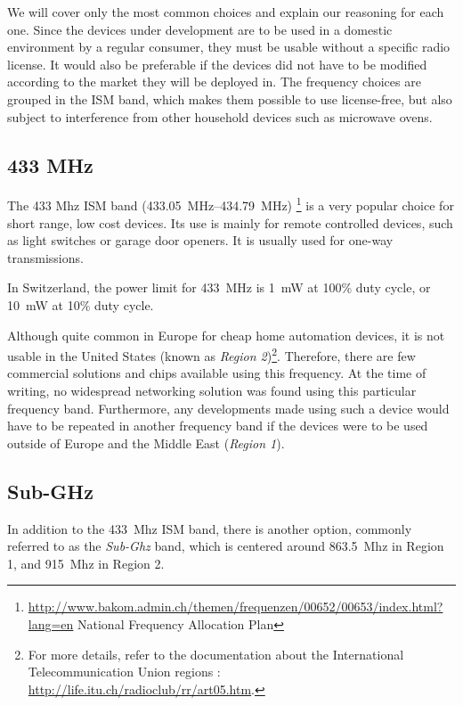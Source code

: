 We will cover only the most common choices and explain our reasoning for each
one. Since the devices under development are to be used in a domestic
environment by a regular consumer, they must be usable without a specific radio
license. It would also be preferable if the devices did not have to be modified
according to the market they will be deployed in. The frequency choices are
grouped in the \ac{ISM} band, which makes them possible to use license-free, but
also subject to interference from other household devices such as microwave
ovens.

\subsection{433 MHz}

The 433 Mhz ISM band (\SIrange{433.05}{434.79}{MHz})
\footnote{\url{http://www.bakom.admin.ch/themen/frequenzen/00652/00653/index.html?lang=en}
National Frequency Allocation Plan} is a very popular choice for short range,
low cost devices. Its use is mainly for remote controlled devices, such as light
switches or garage door openers. It is usually used for one-way transmissions.

In Switzerland, the power limit for \SI{433}{MHz} is \SI{1}{mW} at 100\% duty
cycle, or \SI{10}{mW} at 10\% duty cycle.


Although quite common in Europe for cheap home automation devices, it is not
usable in the United States (known as \emph{Region
2})\footnote{For more details, refer to the documentation about the
  International Telecommunication Union regions
  : \url{http://life.itu.ch/radioclub/rr/art05.htm}.}.
Therefore, there are few commercial solutions and chips available using this
frequency. At the time of writing, no widespread networking solution was found
using this particular frequency band.  Furthermore, any developments made using
such a device would have to be repeated in another frequency band if the devices
were to be used outside of Europe and the Middle East (\emph{Region 1}).


\subsection{Sub-GHz}

In addition to the \SI{433}{Mhz} \ac{ISM} band, there is another option,
commonly referred to as the \emph{Sub-Ghz} band, which is centered around
\SI{863.5}{Mhz} in Region 1, and \SI{915}{Mhz} in Region 2.

